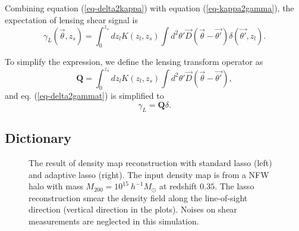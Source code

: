 \documentclass[twocolumn]{aastex62}
\begin{document}
Combining equation (\ref{eq-delta2kappa}) with equation (\ref{eq-kappa2gamma}), the expectation of lensing shear signal is 
\begin{equation}\label{eq-delta2gammat}
\gamma_L(\vec{\theta},z_s) = \int_0^{z_s} dz_l K(z_l,z_s) \int d^2 \theta' \vec{D}(\vec{\theta}-\vec{\theta'}) \delta(\vec{\theta'},z_l).
\end{equation}

To simplify the expression, we define the lensing transform operator as
\begin{equation}
\mathbf{Q}=\int_0^{z_s} dz_l K(z_l,z_s) \int d^2 \theta'  \vec{D}(\vec{\theta}-\vec{\theta'}),
\end{equation}
and eq. (\ref{eq-delta2gammat}) is simplified to
\begin{equation} \label{eq-delta2gammat-simp}
\gamma_L=\mathbf{Q}\delta.
\end{equation}

\subsection{Dictionary}
\label{subsec:method-dictionary}

\begin{figure}[!t]
\centering
{}
\caption{The result of density map reconstruction with standard lasso (left) and adaptive lasso (right). The input density 
        map is from a NFW halo with mass $M_{200}=10^{15} ~h^{-1}M_{\odot}$ at redshift $0.35$. The lasso reconstruction 
        smear the density field along the line-of-sight direction (vertical direction in the plots). Noises on shear measurements 
        are neglected in this simulation.} \label{fig-lassoVsadaLasso}
\end{figure}
\end{document}
